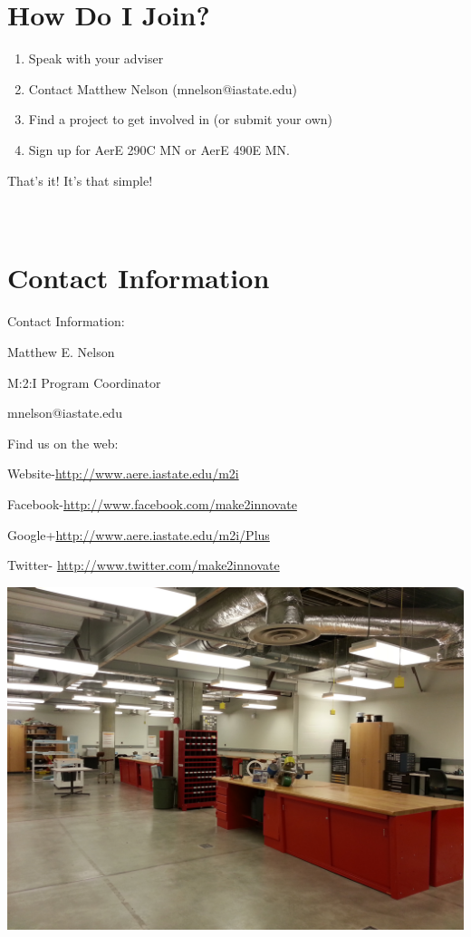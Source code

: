 \documentclass[10pt,foldmark,notumble]{leaflet}
\begin{document}
\section{How Do I Join?}

\begin{enumerate}
\item Speak with your adviser
\item Contact Matthew Nelson (mnelson@iastate.edu)
\item Find a project to get involved in (or submit your own)
\item Sign up for AerE 290C MN or AerE 490E MN.
\end{enumerate}

That's it!  It's that simple!
\ \\ \ \\ \ \\
\section{Contact Information}

\begin{center}
Contact Information:

Matthew E. Nelson

M:2:I Program Coordinator

mnelson@iastate.edu

\end{center}

Find us on the web:

Website-\url{http://www.aere.iastate.edu/m2i}

Facebook-\url{http://www.facebook.com/make2innovate}

Google+\url{http://www.aere.iastate.edu/m2i/Plus}

Twitter- \url{http://www.twitter.com/make2innovate}

\includegraphics[scale=.07]{images/0620_lab.jpg}
\end{document}
